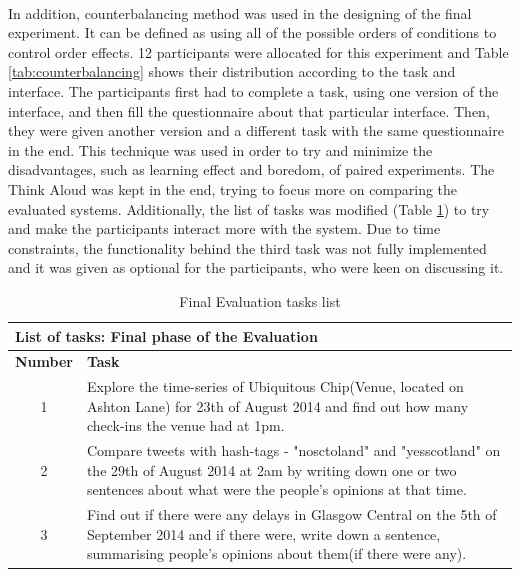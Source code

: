 \documentclass{l4proj}
\begin{document}
{\paragraph{} 
In addition, counterbalancing method was used in the designing of the final experiment. It can be defined as using all of the possible orders of conditions to control order effects\cite{counterbalancing}. 12 participants were allocated for this experiment and Table \ref{tab:counterbalancing} shows their distribution according to the task and interface. The participants first had to complete a task, using one version of the interface, and then fill the questionnaire about that particular interface. Then, they were given another version and a different task with the same questionnaire in the end. This technique was used in order to try and minimize the disadvantages, such as learning effect and boredom, of paired experiments. The Think Aloud was kept in the end, trying to focus more on comparing the evaluated systems. Additionally, the list of tasks was modified (Table \ref{tab:finalevaltasks}) to try and make the participants interact more with the system. Due to time constraints, the functionality behind the third task was not fully implemented and it was given as optional for the participants, who were keen on discussing it.     

\begin{table}[H]
	\centering
	\begin{adjustbox}{width=1\textwidth}
		\begin{tabular}{|c|p{14cm}|}\hline
			\multicolumn{2}{|l|}{\textbf{List of tasks: Final phase of the Evaluation}} \\\hline
			\textbf{Number} & \textbf{Task} \\ \hline
			1
			&
			Explore the time-series of Ubiquitous Chip(Venue, located on Ashton Lane) for 23th of August 2014 and find out how many check-ins the venue had at 1pm.
			\tabularnewline\hline
			2
			&
			Compare tweets with hash-tags - "nosctoland" and "yesscotland" on the 29th of August 2014 at 2am by writing down one or two sentences about what were the people's opinions at that time.
			\tabularnewline\hline
			3
			&
			Find out if there were any delays in Glasgow Central on the 5th of September 2014 and if there were, write down a sentence, summarising people's opinions about them(if there were any).
			\tabularnewline\hline
		\end{tabular}
	\end{adjustbox}
	\caption{Final Evaluation tasks list}
	\label{tab:finalevaltasks}
\end{table}



}
\end{document}
